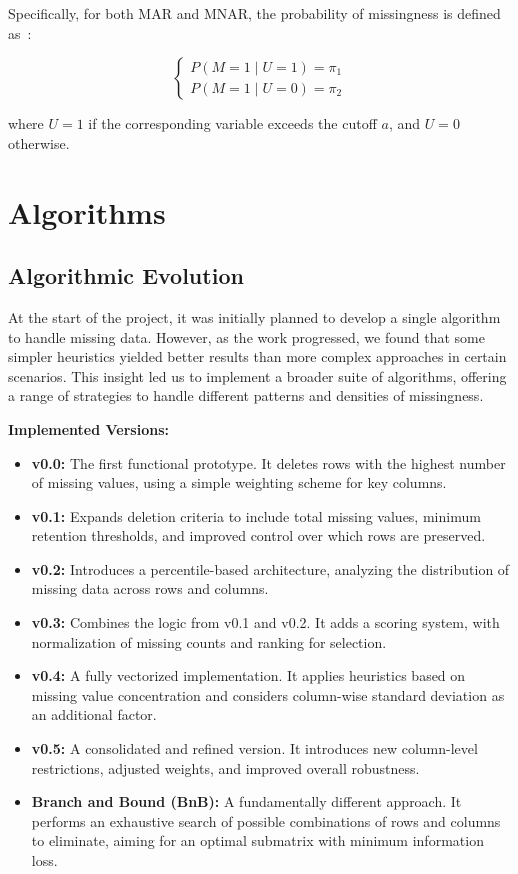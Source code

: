 \documentclass[a4paper,12pt]{article}
\begin{document}
Specifically, for both MAR and MNAR, the probability of missingness is defined as~\cite{24}:

\[
\begin{cases}
P(M=1 \mid U=1) = \pi_1 \\
P(M=1 \mid U=0) = \pi_2
\end{cases}
\]

where \(U=1\) if the corresponding variable exceeds the cutoff \(a\), and \(U=0\) otherwise.


\newpage
\section{Algorithms}
\subsection{Algorithmic Evolution}
At the start of the project, it was initially planned to develop a single algorithm to handle missing data. However, as the work progressed, we found that some simpler heuristics yielded better results than more complex approaches in certain scenarios. This insight led us to implement a broader suite of algorithms, offering a range of strategies to handle different patterns and densities of missingness.

\textbf{Implemented Versions:}
\begin{itemize}
    \item \textbf{v0.0:} The first functional prototype. It deletes rows with the highest number of missing values, using a simple weighting scheme for key columns.
    
    \item \textbf{v0.1:} Expands deletion criteria to include total missing values, minimum retention thresholds, and improved control over which rows are preserved.
    
    \item \textbf{v0.2:} Introduces a percentile-based architecture, analyzing the distribution of missing data across rows and columns.
    
    \item \textbf{v0.3:} Combines the logic from v0.1 and v0.2. It adds a scoring system, with normalization of missing counts and ranking for selection.
    
    \item \textbf{v0.4:} A fully vectorized implementation. It applies heuristics based on missing value concentration and considers column-wise standard deviation as an additional factor.
    
    \item \textbf{v0.5:} A consolidated and refined version. It introduces new column-level restrictions, adjusted weights, and improved overall robustness.
    
    \item \textbf{Branch and Bound (BnB):} A fundamentally different approach. It performs an exhaustive search of possible combinations of rows and columns to eliminate, aiming for an optimal submatrix with minimum information loss.
\end{itemize}
\end{document}
